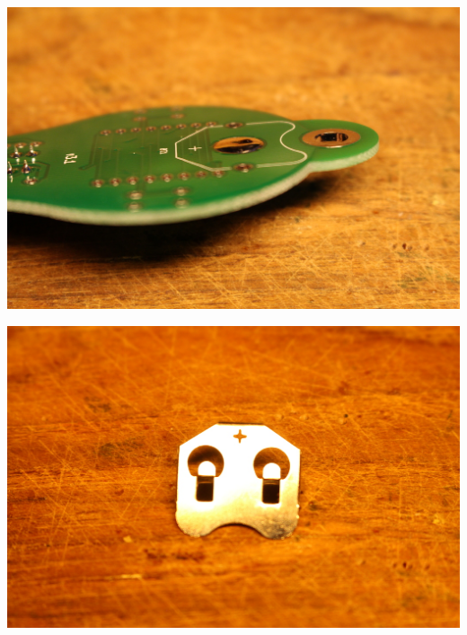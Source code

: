 \documentclass{article}
\begin{document}
\vspace{0.5cm}

\begin{minipage}[b]{0.5\textwidth}
	\includegraphics[width=\textwidth]{Bilder2021/IMG_8141.JPG}
\end{minipage}
\begin{minipage}[b]{0.5\textwidth}
	\includegraphics[width=\textwidth]{Bilder2021/IMG_8142.JPG}
\end{minipage}

\vspace{0.5cm}
\end{document}
